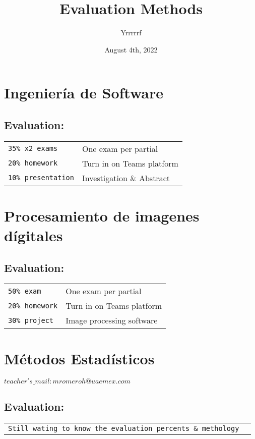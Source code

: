 \documentclass{article}
\title{Evaluation Methods}
\author{Yrrrrrf}
\date{August 4th, 2022}
\begin{document}
    \maketitle    

    \section{Ingeniería de Software}
        \subsection{Evaluation:}
        \begin{tabular}{ll}
            \texttt{35\% x2 exams} & One exam per partial \\
            \texttt{20\% homework} & Turn in on Teams platform \\
            \texttt{10\% presentation} & Investigation \& Abstract \\
        \end{tabular}


    \section{Procesamiento de imagenes dígitales}
        \subsection{Evaluation:}
        \begin{tabular}{ll}
            \texttt{50\% exam} & One exam per partial \\
            \texttt{20\% homework} & Turn in on Teams platform \\
            \texttt{30\% project} & Image processing software \\
        \end{tabular}


    \section{Métodos Estadísticos}
        $ teacher's\_mail: mromeroh@uaemex.com $
        \subsection{Evaluation:}
        \begin{tabular}{ll}
            \texttt{Still wating to know the evaluation percents \& methology}
        \end{tabular}
\end{document}

